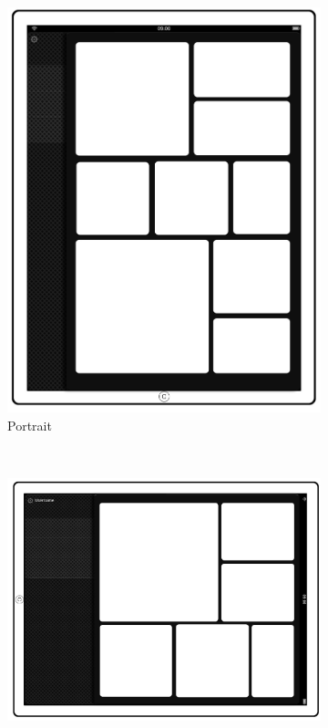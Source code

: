 \documentclass[a4wide, 10pt]{article}
\begin{document}
\begin{figure}
        \centering
        \begin{subfigure}[b]{0.4\textwidth}
                \centering
                \includegraphics[width=\textwidth]{"screenshots/WebApps Portrait Mock-Up"}
                \caption{Portrait}
        \end{subfigure}%
        ~ %
        \begin{subfigure}[b]{0.4\textwidth}
                \centering
                \includegraphics[width=\textwidth]{"screenshots/WebApps Landscape Mock-Up"}

\end{subfigure}
\end{figure}
\end{document}

